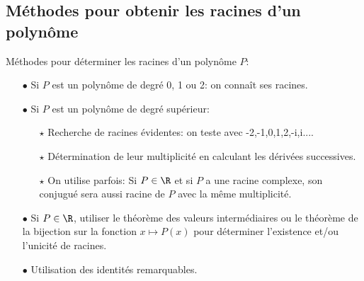 \documentclass[a4paper, 11pt,reqno]{article}
\begin{document}


\subsection{M\'ethodes pour obtenir les racines d'un polyn\^ome}



\colorbox{gray!40}{M\'ethodes pour d\'eterminer les racines d'un polyn\^ome $P$:}\\

\begin{dboxminipage}{0.9\textwidth}
	\begin{itemize}
		\item[$\bullet$] Si $P$ est un polyn\^ome de degr\'e 0, 1 ou 2: on conna\^it ses racines.
		\item[$\bullet$] Si $P$ est un polyn\^ome de degr\'e sup\'erieur:
		      \begin{itemize}
			      \item[$\star$] Recherche de racines \'evidentes: on teste avec -2,-1,0,1,2,-i,i....
			      \item[$\star$] D\'etermination de leur multiplicit\'e en calculant les d\'eriv\'ees successives.
			      \item[$\star$] On utilise parfois: Si $P\in\R$ et si $P$ a une racine complexe, son conjugu\'e sera aussi racine de $P$ avec la m\^eme multiplicit\'e.
		      \end{itemize}
		\item[$\bullet$] Si $P\in\R$, utiliser le th\'eor\`eme des valeurs interm\'ediaires ou le th\'eor\`eme de la bijection sur la fonction $x\mapsto P(x)$ pour d\'eterminer l'existence et/ou l'unicit\'e de racines.
		\item[$\bullet$] Utilisation des identit\'es remarquables.
	\end{itemize}
\end{dboxminipage}
\end{document}

